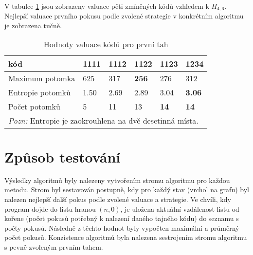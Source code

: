 
V tabulce \ref{tabvaluaceprvnichtahu} jsou zobrazeny valuace pěti zmíněných kódů vzhledem k $H_{4,6}$. Nejlepší valuace prvního pokusu podle zvolené strategie v konkrétním algoritmu je zobrazena tučně. 


\begin{table}[h]
\centering
\begin{tabular}{l l l l l l}
\toprule
kód & 1111 & 1112 & 1122 & 1123 & 1234 \\
\midrule

Maximum potomka & 625 & 317 & \textbf{256} & 276 & 312 \\
Entropie potomků & 1.50 & 2.69 & 2.89 & 3.04 & \textbf{3.06}\\




Počet potomků & 5 & 11 & 13 & \textbf{14} & \textbf{14} \\

\bottomrule
\multicolumn{6}{l}{\footnotesize \textit{Pozn:}
Entropie je zaokrouhlena na dvě desetinná místa.
}

\end{tabular}
\caption{Hodnoty valuace kódů pro první tah}
\label{tabvaluaceprvnichtahu}
\end{table}



\section{Způsob testování}
Výsledky algoritmů byly nalezeny vytvořením stromu algoritmu pro každou metodu. Strom byl sestavován postupně, kdy pro každý stav (vrchol na grafu) byl nalezen nejlepší další pokus podle zvolené valuace a strategie. Ve chvíli, kdy program dojde do listu hranou $(n,0)$, je uložena aktuální vzdálenost listu od kořene (počet pokusů potřebný k nalezení daného tajného kódu) do seznamu s počty pokusů. 
Následně z těchto hodnot byly vypočten maximální a průměrný počet pokusů. Konzistence algoritmů byla nalezena sestrojením stromu algoritmu s pevně zvoleným prvním tahem.


